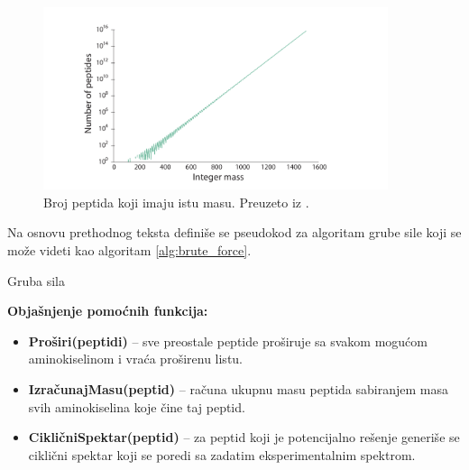 \documentclass[12pt,oneside]{memoir}
\begin{document}
\begin{figure}[h]
  \centering
  \includegraphics[width=0.9\textwidth]{images/number_of_peptides_with_same_mass.png}
  \caption{Broj peptida koji imaju istu masu. Preuzeto iz \cite{online_book}.}
  \label{fig:same_mass}
\end{figure}

Na osnovu prethodnog teksta definiše se pseudokod za algoritam grube sile koji se može videti kao algoritam \ref{alg:brute_force}.

\begin{algorithm}[H]
\label{alg:brute_force}
\caption{Gruba sila}
\SetAlgoLined
\DontPrintSemicolon
{}
\end{algorithm}

\noindent
\textbf{Objašnjenje pomoćnih funkcija:}
\begin{itemize}
  \item \textbf{Proširi(peptidi)} – sve preostale peptide proširuje sa svakom mogućom aminokiselinom i vraća proširenu listu.
  \item \textbf{IzračunajMasu(peptid)} – računa ukupnu masu peptida sabiranjem masa svih aminokiselina koje čine taj peptid.
  \item \textbf{CikličniSpektar(peptid)} – za peptid koji je potencijalno rešenje generiše se ciklični spektar koji se poredi sa zadatim eksperimentalnim spektrom.
\end{itemize}
\end{document}
